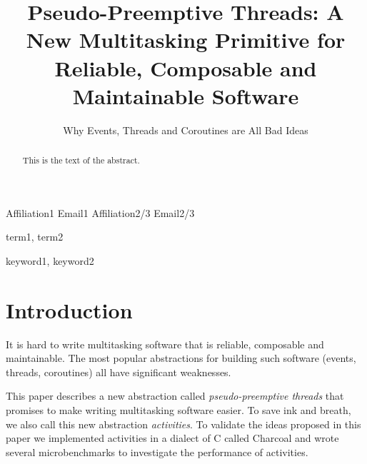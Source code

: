 \documentclass[10pt,preprint]{sigplanconf}
\begin{document}
\newcommand{\charcoal}{Charcoal}

\setlength{\pdfpageheight}{\paperheight}
\setlength{\pdfpagewidth}{\paperwidth}



\title{Pseudo-Preemptive Threads: A New Multitasking Primitive for Reliable, Composable and Maintainable Software}
\subtitle{Why Events, Threads and Coroutines are All Bad Ideas\footnotemark}

           {Affiliation1}
           {Email1}
           {Affiliation2/3}
           {Email2/3}

\maketitle

\begin{abstract}
This is the text of the abstract.
\end{abstract}


\terms
term1, term2

\keywords
keyword1, keyword2


\section{Introduction}

It is hard to write multitasking software that is reliable, composable and maintainable.
The most popular abstractions for building such software (events, threads, coroutines) all have significant weaknesses.

This paper describes a new abstraction called \emph{pseudo-preemptive threads} that promises to make writing multitasking software easier.
To save ink and breath, we also call this new abstraction \emph{activities}.
To validate the ideas proposed in this paper we implemented activities in a dialect of C called \charcoal{} and wrote several microbenchmarks to investigate the performance of activities.
\end{document}
